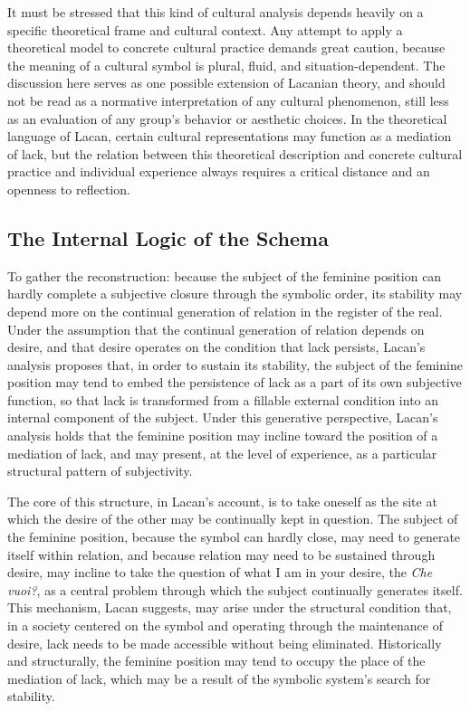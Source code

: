 It must be stressed that this kind of cultural analysis depends heavily on a specific theoretical frame and cultural context. Any attempt to apply a theoretical model to concrete cultural practice demands great caution, because the meaning of a cultural symbol is plural, fluid, and situation-dependent. The discussion here serves as one possible extension of Lacanian theory, and should not be read as a normative interpretation of any cultural phenomenon, still less as an evaluation of any group's behavior or aesthetic choices. In the theoretical language of Lacan, certain cultural representations may function as a mediation of lack, but the relation between this theoretical description and concrete cultural practice and individual experience always requires a critical distance and an openness to reflection.

\subsection{The Internal Logic of the Schema}

To gather the reconstruction: because the subject of the feminine position can hardly complete a subjective closure through the symbolic order, its stability may depend more on the continual generation of relation in the register of the real. Under the assumption that the continual generation of relation depends on desire, and that desire operates on the condition that lack persists, Lacan's analysis proposes that, in order to sustain its stability, the subject of the feminine position may tend to embed the persistence of lack as a part of its own subjective function, so that lack is transformed from a fillable external condition into an internal component of the subject. Under this generative perspective, Lacan's analysis holds that the feminine position may incline toward the position of a mediation of lack, and may present, at the level of experience, as a particular structural pattern of subjectivity.

The core of this structure, in Lacan's account, is to take oneself as the site at which the desire of the other may be continually kept in question. The subject of the feminine position, because the symbol can hardly close, may need to generate itself within relation, and because relation may need to be sustained through desire, may incline to take the question of what I am in your desire, the \textit{Che vuoi?}, as a central problem through which the subject continually generates itself. This mechanism, Lacan suggests, may arise under the structural condition that, in a society centered on the symbol and operating through the maintenance of desire, lack needs to be made accessible without being eliminated. Historically and structurally, the feminine position may tend to occupy the place of the mediation of lack, which may be a result of the symbolic system's search for stability.

